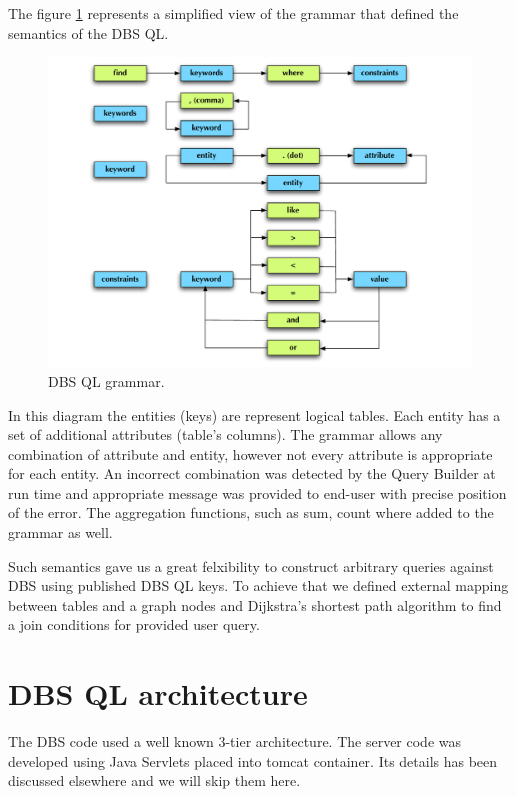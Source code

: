 \documentclass[a4paper]{jpconf}
\begin{document}
The figure \ref{Grammar} represents a simplified view of the grammar
that defined the semantics of the DBS QL.
\begin{figure}[htb]
\centering
\includegraphics[width=150mm]{DBSSql_grammar.pdf}
\caption{
DBS QL grammar.
}
\label{Grammar}
\end{figure}
In this diagram the entities (keys) are represent logical tables. 
Each entity has a set of additional attributes (table’s columns). 
The grammar allows any combination of 
attribute and entity, however not every attribute
is appropriate for each entity. An incorrect
combination was detected by the Query Builder at run time
and appropriate message was provided to end-user with
precise position of the error. The aggregation functions, such
as sum, count where added to the grammar as well. 

Such semantics gave us a great felxibility to construct
arbitrary queries against DBS using published DBS QL keys.
To achieve that we defined external mapping between
tables and a graph nodes and 
Dijkstra’s shortest path algorithm to find a join conditions
for provided user query.

\section{DBS QL architecture}

The DBS code used a well known 3-tier architecture. The server
code was developed using Java Servlets placed into tomcat container.
Its details has been discussed elsewhere\cite{DBS} and we will skip
them here. 
\end{document}
